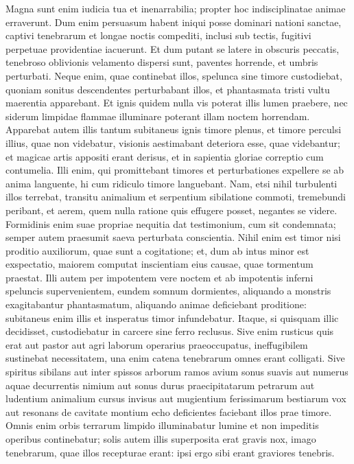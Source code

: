 \begin{biblechapter}  
\verse Magna sunt enim iudicia tua et inenarrabilia; propter hoc indisciplinatae animae erraverunt. 
\verse Dum enim persuasum habent iniqui posse dominari nationi sanctae, captivi tenebrarum et longae noctis compediti, inclusi sub tectis, fugitivi perpetuae providentiae iacuerunt. 
\verse Et dum putant se latere in obscuris peccatis, tenebroso oblivionis velamento dispersi sunt, paventes horrende, et umbris perturbati. 
\verse Neque enim, quae continebat illos, spelunca sine timore custodiebat, quoniam sonitus descendentes perturbabant illos, et phantasmata tristi vultu maerentia apparebant. 
\verse Et ignis quidem nulla vis poterat illis lumen praebere, nec siderum limpidae flammae illuminare poterant illam noctem horrendam. 
\verse Apparebat autem illis tantum subitaneus ignis timore plenus, et timore perculsi illius, quae non videbatur, visionis aestimabant deteriora esse, quae videbantur; 
\verse et magicae artis appositi erant derisus, et in sapientia gloriae correptio cum contumelia. 
\verse Illi enim, qui promittebant timores et perturbationes expellere se ab anima languente, hi cum ridiculo timore languebant. 
\verse Nam, etsi nihil turbulenti illos terrebat, transitu animalium et serpentium sibilatione commoti, tremebundi peribant, et aerem, quem nulla ratione quis effugere posset, negantes se videre. 
\verse Formidinis enim suae propriae nequitia dat testimonium, cum sit condemnata; semper autem praesumit saeva perturbata conscientia. 
\verse Nihil enim est timor nisi proditio auxiliorum, quae sunt a cogitatione; 
\verse et, dum ab intus minor est exspectatio, maiorem computat inscientiam eius causae, quae tormentum praestat. 
\verse Illi autem per impotentem vere noctem et ab impotentis inferni speluncis supervenientem, eundem somnum dormientes, 
\verse aliquando a monstris exagitabantur phantasmatum, aliquando animae deficiebant proditione: subitaneus enim illis et insperatus timor infundebatur. 
\verse Itaque, si quisquam illic decidisset, custodiebatur in carcere sine ferro reclusus. 
\verse Sive enim rusticus quis erat aut pastor aut agri laborum operarius praeoccupatus, ineffugibilem sustinebat necessitatem, una enim catena tenebrarum omnes erant colligati. 
\verse Sive spiritus sibilans aut inter spissos arborum ramos avium sonus suavis aut numerus aquae decurrentis nimium aut sonus durus praecipitatarum petrarum 
\verse aut ludentium animalium cursus invisus aut mugientium ferissimarum bestiarum vox aut resonans de cavitate montium echo deficientes faciebant illos prae timore. 
\verse Omnis enim orbis terrarum limpido illuminabatur lumine et non impeditis operibus continebatur; 
\verse solis autem illis superposita erat gravis nox, imago tenebrarum, quae illos recepturae erant: ipsi ergo sibi erant graviores tenebris. 
\end{biblechapter}

